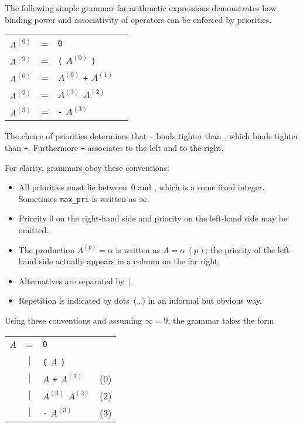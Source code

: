 The following simple grammar for arithmetic expressions demonstrates how
binding power and associativity of operators can be enforced by priorities.
\begin{center}
\begin{tabular}{rclr}
  $A^{(9)}$ & = & {\tt0} \\
  $A^{(9)}$ & = & {\tt(} $A^{(0)}$ {\tt)} \\
  $A^{(0)}$ & = & $A^{(0)}$ {\tt+} $A^{(1)}$ \\
  $A^{(2)}$ & = & $A^{(3)}$ {\tt*} $A^{(2)}$ \\
  $A^{(3)}$ & = & {\tt-} $A^{(3)}$
\end{tabular}
\end{center}
The choice of priorities determines that {\tt -} binds tighter than {\tt *},
which binds tighter than {\tt +}.  Furthermore {\tt +} associates to the
left and {\tt *} to the right.

For clarity, grammars obey these conventions:
\begin{itemize}
\item All priorities must lie between~0 and , which is a
  some fixed integer.  Sometimes {\tt max_pri} is written as $\infty$.
\item Priority 0 on the right-hand side and priority  on
  the left-hand side may be omitted.
\item The production $A^{(p)} = \alpha$ is written as $A = \alpha~(p)$; the
  priority of the left-hand side actually appears in a column on the far
  right.
\item Alternatives are separated by~$|$.
\item Repetition is indicated by dots~(\dots) in an informal but obvious
  way.
\end{itemize}

Using these conventions and assuming $\infty=9$, the grammar
takes the form
\begin{center}
\begin{tabular}{rclc}
$A$ & = & {\tt0} & \hspace*{4em} \\
 & $|$ & {\tt(} $A$ {\tt)} \\
 & $|$ & $A$ {\tt+} $A^{(1)}$ & (0) \\
 & $|$ & $A^{(3)}$ {\tt*} $A^{(2)}$ & (2) \\
 & $|$ & {\tt-} $A^{(3)}$ & (3)
\end{tabular}
\end{center}


